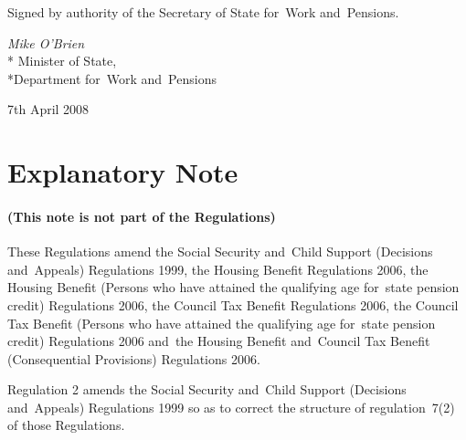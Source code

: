 \documentclass[12pt,a4paper]{article}
\begin{document}
\pagebreak[3]

\bigskip

Signed 
by authority of the 
Secretary of State for~Work and~Pensions.

{\raggedleft
\emph{Mike O'Brien}\\*
Minister
of State,\\*Department 
for~Work and~Pensions

}

7th April 2008

\small

\part{Explanatory Note}

\renewcommand\parthead{— Explanatory Note}

\subsection*{(This note is not part of the Regulations)}

These Regulations amend the Social Security and~Child Support (Decisions and~Appeals) Regulations 1999, the Housing Benefit Regulations 2006, the Housing Benefit (Persons who have attained the qualifying age for~state pension credit) Regulations 2006, the Council Tax Benefit Regulations 2006, the Council Tax Benefit (Persons who have attained the qualifying age for~state pension credit) Regulations 2006 and~the Housing Benefit and~Council Tax Benefit (Consequential Provisions) Regulations 2006.

Regulation 2 amends the Social Security and~Child Support (Decisions and~Appeals) Regulations 1999 so as to correct the structure of regulation~7(2) of those Regulations.
\end{document}
